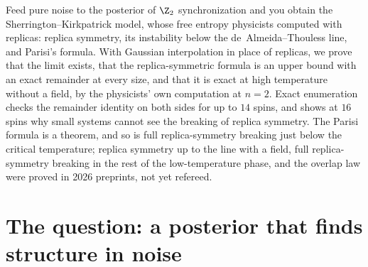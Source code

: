 \begin{refsection}
\newcommand{\skRS}{\phi_{\mathrm{RS}}}
\newcommand{\sksech}{\mathop{\mathrm{sech}}\nolimits}
\newcommand{\skAT}{\mathrm{AT}}
\newcommand{\skPar}{\mathcal{P}}

\begin{chaptersummary}
Feed pure noise to the posterior of $\Z_2$ synchronization and you obtain the Sherrington--Kirkpatrick model, whose free entropy physicists computed with replicas: replica symmetry, its instability below the de~Almeida--Thouless line, and Parisi's formula. With Gaussian interpolation in place of replicas, we prove that the limit exists, that the replica-symmetric formula is an upper bound with an exact remainder at every size, and that it is exact at high temperature without a field, by the physicists' own computation at $n=2$. Exact enumeration checks the remainder identity on both sides for up to $14$ spins, and shows at $16$ spins why small systems cannot see the breaking of replica symmetry. The Parisi formula is a theorem, and so is full replica-symmetry breaking just below the critical temperature; replica symmetry up to the line with a field, full replica-symmetry breaking in the rest of the low-temperature phase, and the overlap law were proved in 2026 preprints, not yet refereed.
\end{chaptersummary}

\section{The question: a posterior that finds structure in noise}\label{sec:sk:question}


\end{refsection}
